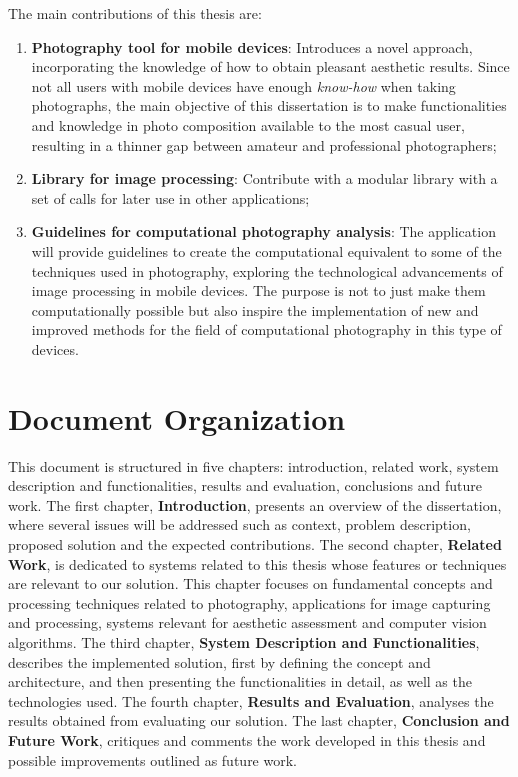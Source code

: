The main contributions of this thesis are:
\begin{enumerate}
	\item \textbf{Photography tool for mobile devices}: Introduces a novel approach, incorporating the knowledge of how to obtain pleasant aesthetic results. Since not all users with mobile devices have enough \emph{know-how} when taking photographs, the main objective of this dissertation is to make functionalities and knowledge in photo composition available to the most casual user, resulting in a thinner gap between amateur and professional photographers;

	\item \textbf{Library for image processing}: Contribute with a modular library with a set of calls for later use in other applications;
	
	\item \textbf{Guidelines for computational photography analysis}: The application will provide guidelines to create the computational equivalent to some of the techniques used in photography, exploring the technological advancements of image processing in mobile devices. The purpose is not to just make them computationally possible but also inspire the implementation of new and improved methods for the field of computational photography in this type of devices.
	
\end{enumerate}

\section{Document Organization}
\label{sec:aperture}

This document is structured in five chapters: introduction, related work, system description and functionalities, results and evaluation, conclusions and future work.
The first chapter, \textbf{Introduction}, presents an overview of the dissertation, where several issues will be addressed such as context, problem description, proposed solution and the expected contributions. The second chapter, \textbf{Related Work}, is dedicated to systems related to this thesis whose features or techniques are relevant to our solution. This chapter focuses on fundamental concepts and processing techniques related to photography, applications for image capturing and processing, systems relevant for aesthetic assessment and computer vision algorithms.
The third chapter, \textbf{System Description and Functionalities}, describes the implemented solution, first by defining the concept and architecture, and then presenting the functionalities in detail, as well as the technologies used. The fourth chapter, \textbf{Results and Evaluation}, analyses the results obtained from evaluating our solution. The last chapter, \textbf{Conclusion and Future Work}, critiques and comments the work developed in this thesis and possible improvements outlined as future work.